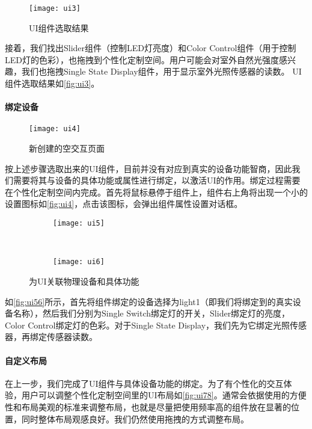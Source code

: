 \begin{figure}[t]
	\centering
	\texttt{[image: ui3]}
	\caption{UI组件选取结果}
	\label{fig:ui3}
\end{figure}

接着，我们找出Slider组件（控制LED灯亮度）和Color Control组件（用于控制LED灯的色彩），也拖拽到个性化定制空间。用户可能会对室外自然光强度感兴趣，我们也拖拽Single State Display组件，用于显示室外光照传感器的读数。
UI组件选取结果如\autoref{fig:ui3}。

\paragraph{绑定设备}

\begin{figure}[htb]
	\centering
	\texttt{[image: ui4]}
	\caption{新创建的空交互页面}
	\label{fig:ui4}
\end{figure}

按上述步骤选取出来的UI组件，目前并没有对应到真实的设备功能智商，因此我们需要将其与设备的具体功能或属性进行绑定，以激活UI的作用。绑定过程需要在个性化定制空间内完成。首先将鼠标悬停于组件上，组件右上角将出现一个小的设置图标如\autoref{fig:ui4}，点击该图标，会弹出组件属性设置对话框。

\begin{figure}[htb]
	\centering
	\begin{subfigure}{.48\linewidth}
		\texttt{[image: ui5]}
		\caption{}
	\end{subfigure}
	\ 
	\begin{subfigure}{.44\linewidth}
		\texttt{[image: ui6]}
		\caption{}
	\end{subfigure}
	\caption{为UI关联物理设备和具体功能}\label{fig:ui56}
\end{figure}

如\autoref{fig:ui56}所示，首先将组件绑定的设备选择为light1（即我们将绑定到的真实设备名称），然后我们分别为Single Switch绑定灯的开关，Slider绑定灯的亮度，Color Control绑定灯的色彩。对于Single State Display，我们先为它绑定光照传感器，再绑定传感器读数。

\paragraph{自定义布局}
在上一步，我们完成了UI组件与具体设备功能的绑定。为了有个性化的交互体验，用户可以调整个性化定制空间里的UI布局如\autoref{fig:ui78}。通常会依据使用的方便性和布局美观的标准来调整布局，也就是尽量把使用频率高的组件放在显著的位置，同时整体布局观感良好。我们仍然使用拖拽的方式调整布局。


